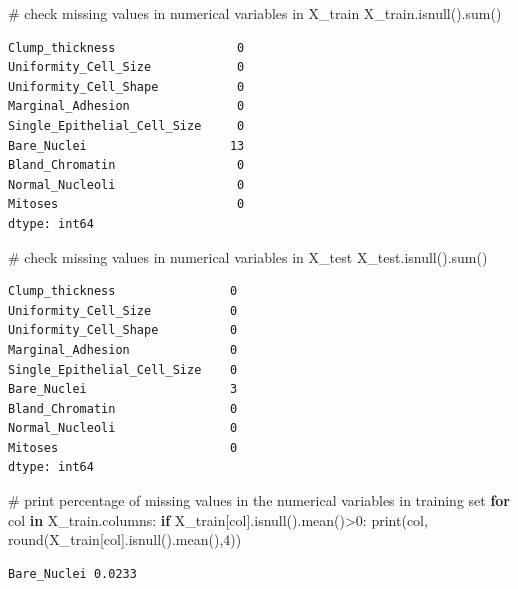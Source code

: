 \documentclass[
  letterpaper,
  DIV=11,
  numbers=noendperiod]{scrreprt}
\newenvironment{Shaded}{\begin{snugshade}}{\end{snugshade}}
\newcommand{\BuiltInTok}[1]{\textcolor[rgb]{0.00,0.23,0.31}{#1}}
\newcommand{\CommentTok}[1]{\textcolor[rgb]{0.37,0.37,0.37}{#1}}
\newcommand{\ControlFlowTok}[1]{\textcolor[rgb]{0.00,0.23,0.31}{\textbf{#1}}}
\newcommand{\DecValTok}[1]{\textcolor[rgb]{0.68,0.00,0.00}{#1}}
\newcommand{\KeywordTok}[1]{\textcolor[rgb]{0.00,0.23,0.31}{\textbf{#1}}}
\newcommand{\NormalTok}[1]{\textcolor[rgb]{0.00,0.23,0.31}{#1}}
\newcommand{\OperatorTok}[1]{\textcolor[rgb]{0.37,0.37,0.37}{#1}}
\begin{document}
\begin{Shaded}
\begin{Highlighting}[]
\CommentTok{\# check missing values in numerical variables in X\_train}
\NormalTok{X\_train.isnull().}\BuiltInTok{sum}\NormalTok{()}
\end{Highlighting}
\end{Shaded}

\begin{verbatim}
Clump_thickness                 0
Uniformity_Cell_Size            0
Uniformity_Cell_Shape           0
Marginal_Adhesion               0
Single_Epithelial_Cell_Size     0
Bare_Nuclei                    13
Bland_Chromatin                 0
Normal_Nucleoli                 0
Mitoses                         0
dtype: int64
\end{verbatim}

\begin{Shaded}
\begin{Highlighting}[]
\CommentTok{\# check missing values in numerical variables in X\_test}
\NormalTok{X\_test.isnull().}\BuiltInTok{sum}\NormalTok{()}
\end{Highlighting}
\end{Shaded}

\begin{verbatim}
Clump_thickness                0
Uniformity_Cell_Size           0
Uniformity_Cell_Shape          0
Marginal_Adhesion              0
Single_Epithelial_Cell_Size    0
Bare_Nuclei                    3
Bland_Chromatin                0
Normal_Nucleoli                0
Mitoses                        0
dtype: int64
\end{verbatim}

\begin{Shaded}
\begin{Highlighting}[]
\CommentTok{\# print percentage of missing values in the numerical variables in training set}
\ControlFlowTok{for}\NormalTok{ col }\KeywordTok{in}\NormalTok{ X\_train.columns:}
    \ControlFlowTok{if}\NormalTok{ X\_train[col].isnull().mean()}\OperatorTok{\textgreater{}}\DecValTok{0}\NormalTok{:}
        \BuiltInTok{print}\NormalTok{(col, }\BuiltInTok{round}\NormalTok{(X\_train[col].isnull().mean(),}\DecValTok{4}\NormalTok{))}
\end{Highlighting}
\end{Shaded}

\begin{verbatim}
Bare_Nuclei 0.0233
\end{verbatim}
\end{document}
